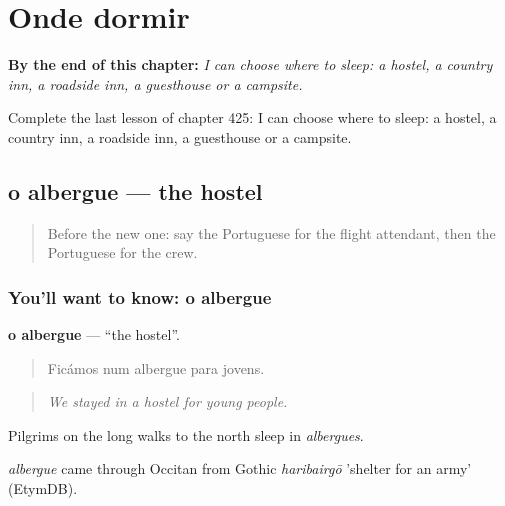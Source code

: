 
\chapter{Onde dormir}
\label{ch:pt-onde-dormir}

\begin{chapteropening}
\textbf{By the end of this chapter:} \emph{I can choose where to sleep: a hostel, a country inn, a roadside inn, a guesthouse or a campsite.}

Complete the last lesson of chapter 425: I can choose where to sleep: a hostel, a country inn, a roadside inn, a guesthouse or a campsite.
\end{chapteropening}

\section[o albergue]{o albergue — the hostel}

\label{lesson:PT-C425-albergue}



\begin{quote}
Before the new one: say the Portuguese for the flight attendant, then the Portuguese for the crew.
\end{quote}

\subsection*{You'll want to know: o albergue}
\textbf{o albergue} — \textquotedblleft{}the hostel\textquotedblright{}.

\begin{quote}
Ficámos num albergue para jovens.
\end{quote}

\begin{quote}
\emph{We stayed in a hostel for young people.}
\end{quote}

Pilgrims on the long walks to the north sleep in \emph{albergues}.

\begin{cousinweb}
\emph{albergue} came through Occitan from Gothic \emph{haribairgō} 'shelter for an army' (EtymDB).
\end{cousinweb}

